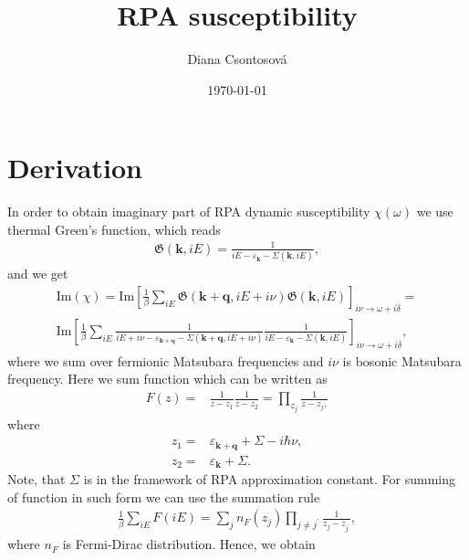 \documentclass[preprint,prb,amsmath,superscriptaddress,showpacs]{revtex4}
\begin{document}
\title{RPA susceptibility}

\author{Diana Csontosová}

\date{\today}

\maketitle

\section{Derivation}

In order to obtain imaginary part of RPA dynamic susceptibility $\chi(\omega)$ we use thermal Green's function, which reads
\begin{align}
    \mathfrak{G}(\mathbf{k}, iE) = \frac{1}{iE - \varepsilon_{\mathbf{k}} - \Sigma(\mathbf{k}, iE)},
\end{align}
and we get
\begin{equation}
    \begin{gathered}
    \mathrm{Im}(\chi) = \mathrm{Im}\left[ \frac{1}{\beta} \sum_{iE} \mathfrak{G}(\mathbf{k}+\mathbf{q}, iE + i\nu)\mathfrak{G}(\mathbf{k}, iE) \right]_{i\nu \rightarrow  \omega + i\delta} = \\
    \mathrm{Im}\left[ \frac{1}{\beta} \sum_{iE} \frac{1}{iE + i\nu - \varepsilon_{\mathbf{k} + \mathbf{q}} - \Sigma(\mathbf{k} + \mathbf{q}, iE + i\nu)} \frac{1}{iE - \varepsilon_{\mathbf{k}} - \Sigma(\mathbf{k}, iE)} \right]_{i\nu \rightarrow \omega + i\delta},
    \end{gathered}
\end{equation}
where we sum over fermionic Matsubara frequencies and $i\nu$ is bosonic Matsubara frequency. Here we sum function which can be written as
\begin{align}
    F(z) =& \frac{1}{z - z_1} \frac{1}{z - z_2} = \prod\limits_{z_j} \frac{1}{z - z_j,}
 \end{align}
 where
 \begin{align*}
    z_1 =& \varepsilon_{\mathbf{k}+\mathbf{q}} + \Sigma - i\hbar \nu, \\
    z_2 =& \varepsilon_{\mathbf{k}} + \Sigma.
 \end{align*}
 Note, that $\Sigma$ is in the framework of RPA approximation constant. For summing of function in such form we can use the summation rule
 \begin{align}
     \frac{1}{\beta} \sum_{iE} F(iE) = \sum_j n_F(z_j) \prod\limits_{j\neq j^{\prime}} \frac{1}{z_j - z_{j^{\prime}}},
 \end{align}
where $n_F$ is Fermi-Dirac distribution. Hence, we obtain
\end{document}
